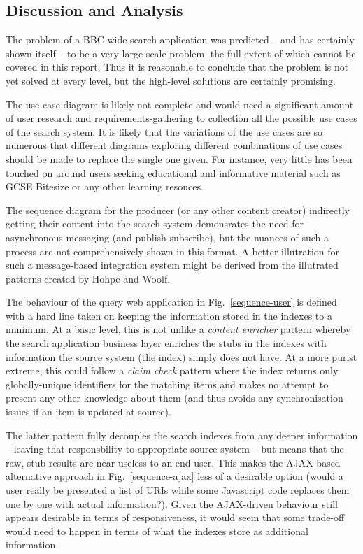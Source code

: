 \documentclass[oribibl]{llncs}
\begin{document}
\subsection{Discussion and Analysis}
\label{appraisal}

The problem of
a BBC-wide search application was predicted --
and has certainly shown itself -- to be a very large-scale problem, the
full extent of which cannot be covered in this report. Thus it
is reasonable to conclude that the problem is not yet solved
at every level, but the high-level solutions are certainly promising.

The use case diagram is likely not complete and would need
a significant amount of user research and requirements-gathering
to collection all the possible use cases of the search system. It
is likely that the variations of the use cases are so numerous
that different diagrams exploring different combinations of use
cases should be made to replace the single one given. For instance,
very little has been touched on around users seeking educational
and informative material such as GCSE Bitesize or any other
learning resouces.

The sequence diagram for the producer (or any other content creator)
indirectly getting their content into the search system demonsrates
the need for asynchronous messaging (and publish-subscribe), but
the nuances of such a process are not comprehensively shown in
this format. A better illutration for such a message-based integration
system might be derived from the illutrated patterns created
by Hohpe and Woolf. \citep{hohpe2004enterprise}

The behaviour of the query web application in Fig.~\ref{sequence-user}
is defined with a hard line
taken on keeping the information stored in the indexes to a minimum.
At a basic level, this is not unlike a \emph{content enricher} pattern
\citep{hohpe2004enterprise} whereby the search application
business layer enriches the stubs in the indexes with information
the source system (the index) simply does not have. At a more purist
extreme, this could follow a \emph{claim check} pattern where
the index returns only globally-unique identifiers for the matching
items and makes no attempt to present any other knowledge about them
(and thus avoids any synchronisation issues if an item is updated at
source).

The latter pattern fully decouples the search indexes from any
deeper information -- leaving that responsbility to appropriate
source system -- but means that the raw, stub results are near-useless
to an end user. This makes the AJAX-based alternative approach
in Fig.~\ref{sequence-ajax}
less of a desirable option (would a user really be presented a list
of URIs while some Javascript code replaces them one by one with
actual information?). Given the AJAX-driven behaviour still appears
desirable in terms of responsiveness, it would seem that some trade-off
would need to happen in terms of what the indexes store as additional
information.
\end{document}
